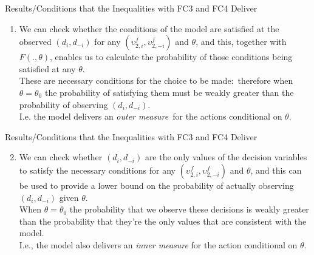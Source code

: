 \documentclass[xcolor=pdftex,dvipsnames,table,mathserif]{beamer}
\begin{document}
\begin{frame}{\normalsize Results/Conditions that the Inequalities with FC3 and FC4 Deliver}

\begin{enumerate}
\item We can check whether the conditions of the model are satisfied at the
observed $(d_{i},d_{-i})$ for any $(\upsilon _{2,i}^{f},\upsilon
_{2,-i}^{f}) $ and $\theta $, and this, together with $F(.,\theta )$,
enables us to calculate the probability of those conditions being satisfied
at any $\theta $. \\
\vspace{0.2 in} 
These are necessary conditions for the choice to be made:\
therefore when $\theta =\theta _{0}$ the probability of satisfying them must
be weakly greater than the probability of observing $(d_{i},d_{-i})$. \\
\vspace{0.2 in} 
I.e. the model delivers an \textit{outer measure}\ for the actions conditional on $%
\theta $.
\end{enumerate}
\end{frame}

\begin{frame}{\normalsize Results/Conditions that the Inequalities with FC3 and FC4 Deliver}
\begin{enumerate}
\setcounter{enumi}{1}
\item We can check whether $(d_{i},d_{-i})$ are the only values of the
decision variables to satisfy the necessary conditions for any $(\upsilon
_{2,i}^{f},\upsilon _{2,-i}^{f})$ and $\theta $, and this can be used to
provide a lower bound on the probability of actually observing $%
(d_{i},d_{-i})$ given $\theta $. \\
\vspace{0.2in}
When $\theta =\theta _{0}$ the probability
that we observe these decisions is weakly greater than the probability that
they're the only values that are consistent with the model. \\
\vspace{0.2 in} 
I.e., the model also delivers an \textit{inner measure} for the action conditional on $\theta $.
\end{enumerate}
\end{frame}
\end{document}
